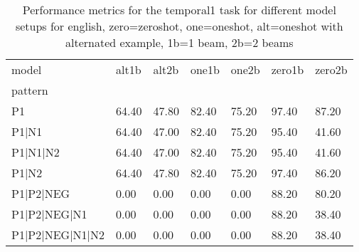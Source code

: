 \begin{table}[h]
\begin{tabular}{l|llllll}
\toprule
model & alt1b & alt2b & one1b & one2b & zero1b & zero2b \\
pattern &  &  &  &  &  &  \\
\midrule
P1 & 64.40 & 47.80 & 82.40 & 75.20 & 97.40 & 87.20 \\
P1|N1 & 64.40 & 47.00 & 82.40 & 75.20 & 95.40 & 41.60 \\
P1|N1|N2 & 64.40 & 47.00 & 82.40 & 75.20 & 95.40 & 41.60 \\
P1|N2 & 64.40 & 47.80 & 82.40 & 75.20 & 97.40 & 86.20 \\
P1|P2|NEG & 0.00 & 0.00 & 0.00 & 0.00 & 88.20 & 80.20 \\
P1|P2|NEG|N1 & 0.00 & 0.00 & 0.00 & 0.00 & 88.20 & 38.40 \\
P1|P2|NEG|N1|N2 & 0.00 & 0.00 & 0.00 & 0.00 & 88.20 & 38.40 \\
\bottomrule
\end{tabular}
\caption{Performance metrics for the temporal1 task for different model setups for english, zero=zeroshot, one=oneshot, alt=oneshot with alternated example, 1b=1 beam, 2b=2 beams}
\label{tab:en_temporal1_performance}
\end{table}
